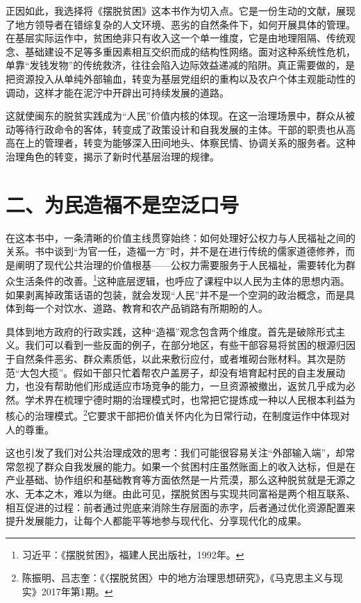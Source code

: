 \documentclass[12pt,a4paper]{ctexart}
\begin{document}
正因如此，我选择将《摆脱贫困》这本书作为切入点。它是一份生动的文献，展现了地方领导者在错综复杂的人文环境、恶劣的自然条件下，如何开展具体的管理。在基层实际运作中，贫困绝非只有收入这一个单一维度，它是由地理阻隔、传统观念、基础建设不足等多重因素相互交织而成的结构性网络。面对这种系统性危机，单靠“发钱发物”的传统救济，往往会陷入边际效益递减的陷阱。真正需要做的，是把资源投入从单纯外部输血，转变为基层党组织的重构以及农户个体主观能动性的调动，这样才能在泥泞中开辟出可持续发展的道路。

这就使闽东的脱贫实践成为“人民”价值内核的体现。在这一治理场景中，群众从被动等待行政命令的客体，转变成了政策设计和自我发展的主体。干部的职责也从高高在上的管理者，转变为能够深入田间地头、体察民情、协调关系的服务者。这种治理角色的转变，揭示了新时代基层治理的规律。

\section*{二、为民造福不是空泛口号}

在这本书中，一条清晰的价值主线贯穿始终：如何处理好公权力与人民福祉之间的关系。书中谈到“为官一任，造福一方”时，并不是在进行传统的儒家道德修养，而是阐明了现代公共治理的价值根基——公权力需要服务于人民福祉，需要转化为群众生活条件的改善。\footnote{习近平：《摆脱贫困》，福建人民出版社，1992年。}这种底层逻辑，也呼应了课程中以人民为主体的思想内涵。如果剥离掉政策话语的包装，就会发现“人民”并不是一个空洞的政治概念，而是具体到每一个对饮水、道路、教育和农产品销路有所期盼的人。

具体到地方政府的行政实践，这种“造福”观念包含两个维度。首先是破除形式主义。我们可以看到一些反面的例子，在部分地区，有些干部容易将贫困的根源归因于自然条件恶劣、群众素质低，以此来敷衍应付，或者堆砌台账材料。其次是防范“大包大揽”。假如干部只忙着帮农户盖房子，却没有培育起村民的自主发展动力，也没有帮助他们形成适应市场竞争的能力，一旦资源被撤出，返贫几乎成为必然。学术界在梳理宁德时期的治理模式时，也常把它提炼成一种以人民根本利益为核心的治理模式。\footnote{陈振明、吕志奎：《〈摆脱贫困〉中的地方治理思想研究》，《马克思主义与现实》2017年第1期。}它要求干部把价值关怀内化为日常行动，在制度运作中体现对人的尊重。

这也引发了我们对公共治理成效的思考：我们可能很容易关注“外部输入端”，却常常忽视了群众自我发展的能力。如果一个贫困村庄虽然账面上的收入达标，但是在产业基础、协作组织和基础教育等方面依然是一片荒漠，那么这种脱贫就是无源之水、无本之木，难以为继。由此可见，摆脱贫困与实现共同富裕是两个相互联系、相互促进的过程：前者通过兜底来消除生存层面的赤字，后者通过优化资源配置来提升发展能力，让每个人都能平等地参与现代化、分享现代化的成果。
\end{document}
